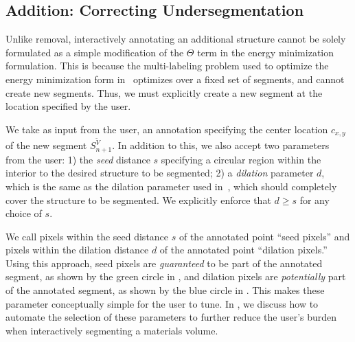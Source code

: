 \documentclass[]{spie}  %
\begin{document}
\subsection{Addition: Correcting Undersegmentation}
\label{sec:addition}

Unlike removal, interactively annotating an additional structure
cannot be solely formulated as a simple modification of the $\Theta$
term in the energy minimization formulation.  This is because the
multi-labeling problem used to optimize the energy minimization form
in~\cite{waggoner:11} optimizes over a fixed set of segments, and
cannot create new segments.  Thus, we must explicitly create a new
segment at the location specified by the user.

We take as input from the user, an annotation specifying the center
location $c_{x,y}$ of the new segment $S^{\tilde{V}}_{n+1}$.  In
addition to this, we also accept two parameters from the user: 1) the
\emph{seed} distance $s$ specifying a circular region within the
interior to the desired structure to be segmented; 2) a
\textit{dilation} parameter $d$, which is the same as the dilation
parameter used in~\cite{waggoner:11}, which should completely cover
the structure to be segmented.  We explicitly enforce that $d \geq s$
for any choice of $s$.

We call pixels within the seed distance $s$ of the annotated point
``seed pixels'' and pixels within the dilation distance $d$ of the
annotated point ``dilation pixels.''  Using this approach, seed pixels
are \emph{guaranteed} to be part of the annotated segment, as shown by
the green circle in , and dilation pixels are
\emph{potentially} part of the annotated segment, as shown by the blue
circle in .  This makes these parameter
conceptually simple for the user to tune.  In , we discuss
how to automate the selection of these parameters to further reduce
the user's burden when interactively segmenting a materials volume.
\end{document}
